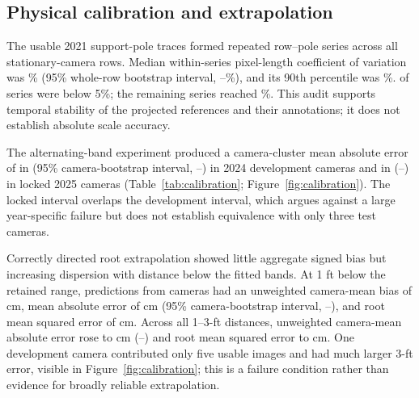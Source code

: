 \documentclass[12pt,letterpaper]{article}
\begin{document}
\subsection{Physical calibration and extrapolation}

The \ManualPoleUsable{} usable 2021 support-pole traces formed \PoleRepeatabilitySeries{} repeated row--pole series across all \PoleRepeatabilityRows{} stationary-camera rows. Median within-series pixel-length coefficient of variation was \PoleRepeatabilityMedianCV{}\% (95\% whole-row bootstrap interval, \PoleRepeatabilityMedianCVLo{}--\PoleRepeatabilityMedianCVHi{}\%), and its 90th percentile was \PoleRepeatabilityNinetiethCV{}\%. \PoleRepeatabilityBelowFive{} of \PoleRepeatabilitySeries{} series were below 5\%; the remaining series reached \PoleRepeatabilityMaximumCV{}\%. This audit supports temporal stability of the projected references and their annotations; it does not establish absolute scale accuracy.

The alternating-band experiment produced a camera-cluster mean absolute error of \PoleDevMAEIn{} in (95\% camera-bootstrap interval, \PoleDevMAELoIn{}--\PoleDevMAEHiIn{}) in 2024 development cameras and \PoleTestMAEIn{} in (\PoleTestMAELoIn{}--\PoleTestMAEHiIn{}) in locked 2025 cameras (Table~\ref{tab:calibration}; Figure~\ref{fig:calibration}). The locked interval overlaps the development interval, which argues against a large year-specific failure but does not establish equivalence with only three test cameras.

Correctly directed root extrapolation showed little aggregate signed bias but increasing dispersion with distance below the fitted bands. At 1 ft below the retained range, \DownOneBandN{} predictions from \DownOneBandCameras{} cameras had an unweighted camera-mean bias of \DownOneBandCameraBiasCm{} cm, mean absolute error of \DownOneBandCameraMAECm{} cm (95\% camera-bootstrap interval, \DownOneBandCameraMAELoCm{}--\DownOneBandCameraMAEHiCm{}), and root mean squared error of \DownOneBandCameraRMSECm{} cm. Across all 1--3-ft distances, unweighted camera-mean absolute error rose to \DownAllCameraMAECm{} cm (\DownAllCameraMAELoCm{}--\DownAllCameraMAEHiCm{}) and root mean squared error to \DownAllCameraRMSECm{} cm. One development camera contributed only five usable images and had much larger 3-ft error, visible in Figure~\ref{fig:calibration}; this is a failure condition rather than evidence for broadly reliable extrapolation.
\end{document}
